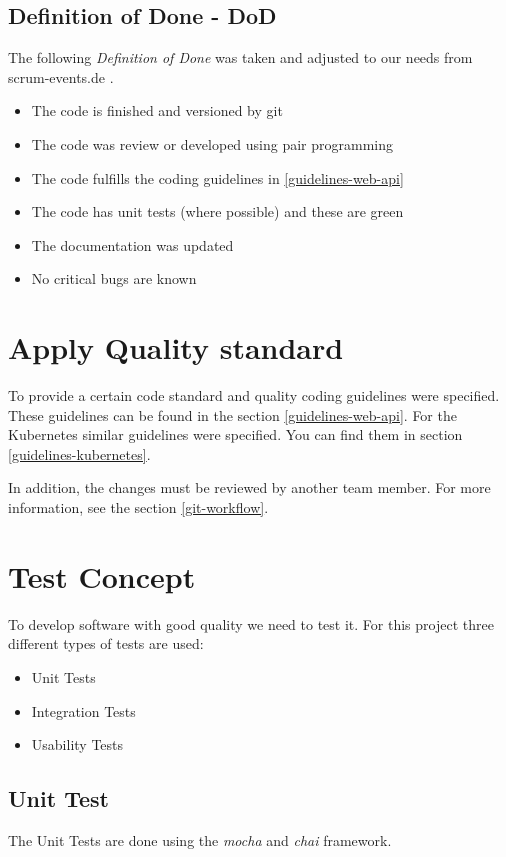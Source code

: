 \subsection{Definition of Done - DoD}
The following \textit{Definition of Done} was taken and adjusted to our needs from scrum-events.de \cite{www.scrum-events.de_dod}.
\begin{itemize}
  \item The code is finished and versioned by git
  \item The code was review or developed using pair programming
  \item The code fulfills the coding guidelines in \ref{guidelines-web-api}
  \item The code has unit tests (where possible) and these are green
  \item The documentation was updated
  \item No critical bugs are known
\end{itemize}

\section{Apply Quality standard}
To provide a certain code standard and quality coding guidelines were specified.
These guidelines can be found in the section \ref{guidelines-web-api}.
For the Kubernetes similar guidelines were specified.
You can find them in section \ref{guidelines-kubernetes}.

In addition, the changes must be reviewed by another team member.
For more information, see the section \ref{git-workflow}.


\section{Test Concept}
To develop software with good quality we need to test it.
For this project three different types of tests are used:

\begin{itemize}
  \item Unit Tests
  \item Integration Tests
  \item Usability Tests
\end{itemize}

\subsection{Unit Test}
The Unit Tests are done using the \textit{mocha} and \textit{chai} framework.

